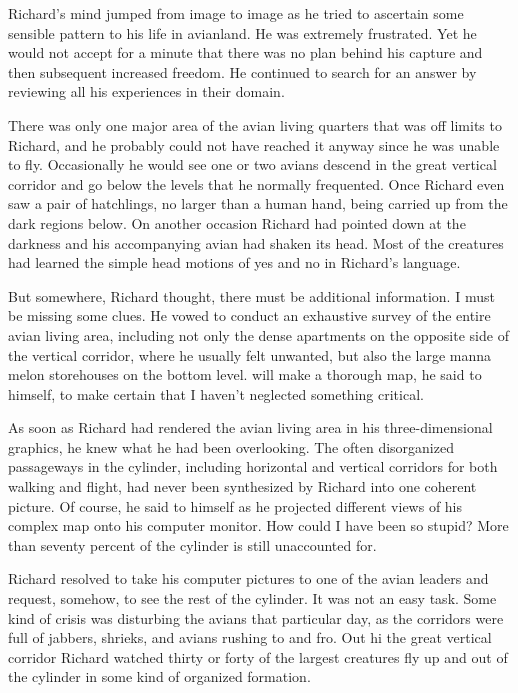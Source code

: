 \documentclass[]{article}
\begin{document}
{Richard’s mind jumped from image to image as he tried to ascertain some sensible pattern to his life in avianland.  He was extremely frustrated.  Yet he would not accept for a minute that there was no plan behind his capture and then subsequent increased freedom.  He continued to search for an answer by reviewing all his experiences in their domain.

There was only one major area of the avian living quarters that was off limits to Richard, and he probably could not have reached it anyway since he was unable to fly.  Occasionally he would see one or two avians descend in the great vertical corridor and go below the levels that he normally frequented.  Once Richard even saw a pair of hatchlings, no larger than a human hand, being carried up from the dark regions below.  On another occasion Richard had pointed down at the darkness and his accompanying avian had shaken its head.  Most of the creatures had learned the simple head motions of yes and no in Richard’s language.

But somewhere, Richard thought, there must be additional information.  I must be missing some clues.  He vowed to conduct an exhaustive survey of the entire avian living area, including not only the dense apartments on the opposite side of the vertical corridor, where he usually felt unwanted, but also the large manna melon storehouses on the bottom level.  will make a thorough map, he said to himself, to make certain that I haven’t neglected something critical.

As soon as Richard had rendered the avian living area in his three-dimensional graphics, he knew what he had been overlooking.  The often disorganized passageways in the cylinder, including horizontal and vertical corridors for both walking and flight, had never been synthesized by Richard into one coherent picture.  Of course, he said to himself as he projected different views of his complex map onto his computer monitor.  How could I have been so stupid? More than seventy percent of the cylinder is still unaccounted for.

Richard resolved to take his computer pictures to one of the avian leaders and request, somehow, to see the rest of the cylinder.  It was not an easy task.  Some kind of crisis was disturbing the avians that particular day, as the corridors were full of jabbers, shrieks, and avians rushing to and fro.  Out hi the great vertical corridor Richard watched thirty or forty of the largest creatures fly up and out of the cylinder in some kind of organized formation.

}
\end{document}
